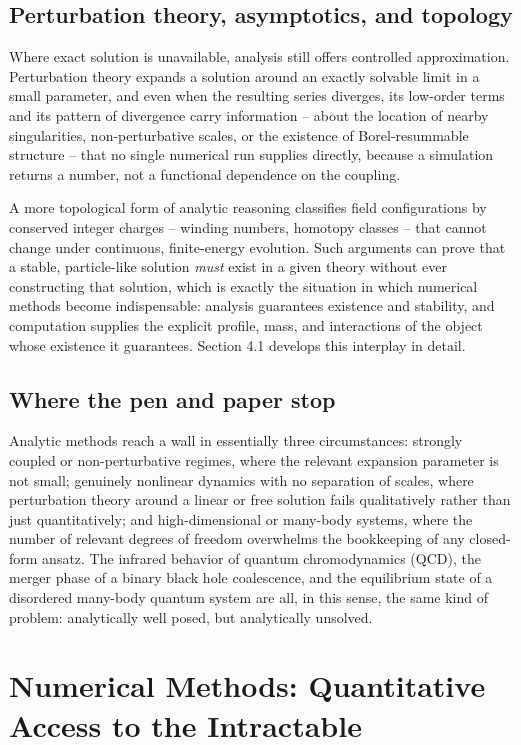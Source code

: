 \subsection{Perturbation theory, asymptotics, and topology}

Where exact solution is unavailable, analysis still offers controlled
approximation. Perturbation theory expands a solution around an exactly
solvable limit in a small parameter, and even when the resulting series
diverges, its low-order terms and its pattern of divergence carry information
-- about the location of nearby singularities, non-perturbative scales, or the
existence of Borel-resummable structure -- that no single numerical run
supplies directly, because a simulation returns a number, not a functional
dependence on the coupling.

A more topological form of analytic reasoning classifies field configurations
by conserved integer charges -- winding numbers, homotopy classes -- that
cannot change under continuous, finite-energy evolution. Such arguments can
prove that a stable, particle-like solution \emph{must} exist in a given theory
without ever constructing that solution, which is exactly the situation in
which numerical methods become indispensable: analysis guarantees existence and
stability, and computation supplies the explicit profile, mass, and
interactions of the object whose existence it guarantees. Section 4.1 develops
this interplay in detail.

\subsection{Where the pen and paper stop}

Analytic methods reach a wall in essentially three circumstances: strongly
coupled or non-perturbative regimes, where the relevant expansion parameter is
not small; genuinely nonlinear dynamics with no separation of scales, where
perturbation theory around a linear or free solution fails qualitatively rather
than just quantitatively; and high-dimensional or many-body systems, where the
number of relevant degrees of freedom overwhelms the bookkeeping of any
closed-form ansatz. The infrared behavior of quantum chromodynamics (QCD), the
merger phase of a binary black hole coalescence, and the equilibrium state of a
disordered many-body quantum system are all, in this sense, the same kind of
problem: analytically well posed, but analytically unsolved.

\section{Numerical Methods: Quantitative Access to the Intractable}

